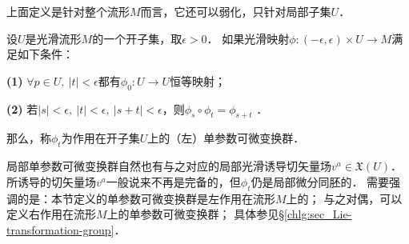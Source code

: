 %
%
%

上面定义是针对整个流形$M$而言，它还可以弱化，只针对局部子集$U$．
\begin{definition}\label{chdm:def_1PTG-local}
    设$U$是光滑流形$M$的一个开子集，取$\epsilon>0$．
    如果光滑映射$\phi:(-\epsilon,\epsilon)\times U \to M $满足如下条件：
    
    {\bfseries (1)} $\forall p\in U,\ |t|< \epsilon$都有$\phi_0 : U\to U$恒等映射；
    
    {\bfseries (2)} 若$|s|<\epsilon,\ |t|<\epsilon, \ |s+t|<\epsilon$，则$\phi_s\circ \phi_t = \phi_{s+t}$ ．
    
    那么，称$\phi_t$为作用在开子集$U$上的{\heiti {}（左）单参数可微变换群}．
\end{definition}
局部单参数可微变换群自然也有与之对应的局部光滑诱导切矢量场$v^a\in \mathfrak{X}(U)$．
所诱导的切矢量场$v^a$一般说来不再是完备的，但$\phi_t$仍是局部微分同胚的．
需要强调的是：本节定义的单参数可微变换群是{\kaishu 左作用}在流形$M$上的；
与之对偶，可以定义{\kaishu 右作用}在流形$M$上的单参数可微变换群；
具体参见\S\ref{chlg:sec_Lie-transformation-group}．

